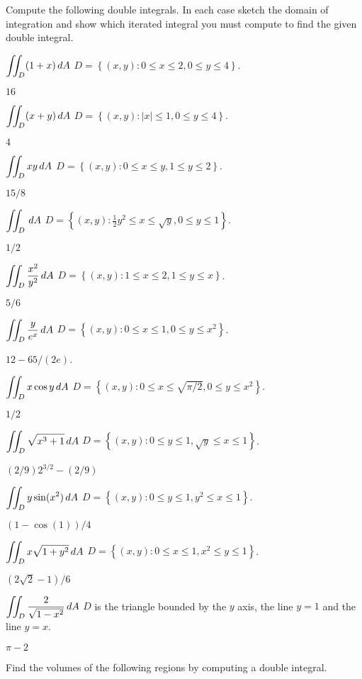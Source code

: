 \problem Compute the following double integrals.  
In each case sketch the domain of integration and
show which iterated integral you must compute to find the given double
integral.

\noindent\parbox{0.8\textwidth}{%
\subprob $\displaystyle \iint_D (1+x) \,dA $
\hfill$D = \left\{ (x,y) : 0\leq x\leq 2, 0\leq y\leq 4 \right\}$.
}
\answer
$16$
\endanswer

\noindent\parbox{0.8\textwidth}{%
\subprob $\displaystyle \iint_D (x+y)\,dA $ 
\hfill$D = \left\{ (x,y) : |x|\leq1, 0\leq y\leq 4 \right\}$.
}
\answer
$4$
\endanswer


\noindent\parbox{0.8\textwidth}{%
\subprob $\displaystyle \iint_D xy \,dA $ 
\hfill$D = \left\{ (x,y) : 0\le x\le y, 1\le y \le 2 \right\}$.
}
\answer
$15/8$
\endanswer


\noindent\parbox{0.8\textwidth}{%
\subprob $\displaystyle \iint_{D} \,dA $ 
\hfill$D = \left\{ (x,y) : \tfrac12y^2\le x\le \sqrt{y}, 0\le y\le 1 \right\}$.
}
\answer
$1/2$
\endanswer


\noindent\parbox{0.8\textwidth}{%
\subprob $\displaystyle \iint_{D} {x^2\over y^2}\,dA $ 
\hfill$D = \left\{ (x,y) : 1\le x\le2, 1\le y\le x \right\}$.
}
\answer
$5/6$
\endanswer


\noindent\parbox{0.8\textwidth}{%
\subprob $\displaystyle \iint_D {y\over e^x}\,dA $ 
\hfill$D = \left\{ (x,y) : 0\le x\le1, 0\le y\le x^2 \right\}$.
}
\answer
$12-65/(2e)$.
\endanswer


\noindent\parbox{0.8\textwidth}{%
\subprob $\displaystyle \iint_D x\cos y\,dA $ 
\hfill$D = \left\{ (x,y) : 0\le x\le \sqrt{\pi/2}, 0\le y\le x^2 \right\}$.
}
\answer
$1/2$
\endanswer


\noindent\parbox{0.8\textwidth}{%
\subprob  $\displaystyle \iint_D  
\sqrt{x^3+1}\,dA $
\hfill$D = \left\{ (x,y) : 0\le y\le 1, \surd y\le x\le 1 \right\}$.
}
\answer
$(2/9)2^{3/2}-(2/9)$
\endanswer

\noindent\parbox{0.8\textwidth}{%
\subprob $\displaystyle \iint_D   y\sin(x^2)\,dA $
\hfill$D = \left\{ (x,y) : 0\le y\le 1, y^2\le x\le 1 \right\}$.
}
\answer
$(1-\cos(1))/4$
\endanswer

\noindent\parbox{0.8\textwidth}{%
\subprob $\displaystyle \iint_D x\sqrt{1+y^2}\,dA $ 
\hfill$D = \left\{ (x,y) : 0\le x\le1, x^2\le y\le1 \right\}$.
}
\answer
$(2\sqrt2-1)/6$
\endanswer

\noindent\parbox{0.8\textwidth}{%
\subprob $\displaystyle \iint_D {2\over\sqrt{1-x^2}}\,dA $ 
\hfill$D$ is the triangle bounded by the $y$ axis, the line $y=1$ and
the line $y=x$.
}
\answer
$\pi-2$
\endanswer

\problem Find the volumes of the following regions 
by computing a double integral.


